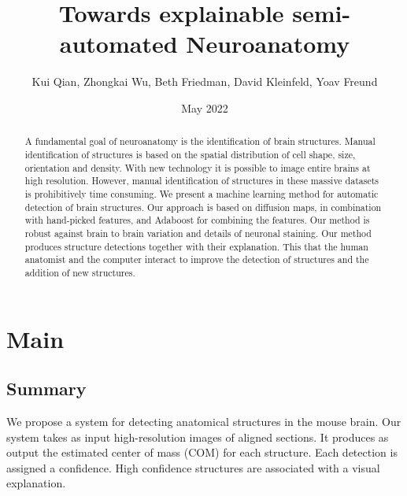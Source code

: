 \documentclass[runningheads]{llncs}
\title{Towards explainable semi-automated Neuroanatomy}
\author{Kui Qian, Zhongkai Wu, Beth Friedman, David Kleinfeld, Yoav Freund}
\date{May 2022}
\begin{document}
\maketitle

\begin{abstract}
  A fundamental goal of neuroanatomy is the identification of brain
  structures.  Manual identification of structures is based on the
  spatial distribution of cell shape, size, orientation and density.
  With new technology it is possible to image entire brains at high
  resolution.  However, manual identification of structures in these
  massive datasets is prohibitively time consuming.  We present a
  machine learning method for automatic detection of brain
  structures. Our approach is based on diffusion maps, in combination
  with hand-picked features, and Adaboost for combining the
  features. Our method is robust against brain to brain variation and
  details of neuronal staining.  Our method produces structure
  detections together with their explanation. This that the human
  anatomist and the computer interact to improve the detection of
  structures and the addition of new structures.
  
\end{abstract}

\section{Main}
\subsection{Summary}
We propose a system for detecting anatomical structures in the mouse brain. Our system takes as input high-resolution images of aligned sections. It produces as output the estimated center of mass (COM) for each structure. Each detection is assigned a confidence. High confidence structures are associated with a visual explanation.
\end{document}
